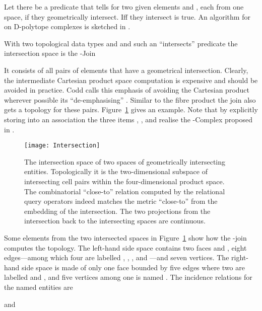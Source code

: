\documentclass[5p]{elsarticle}
\newcommand{\qq}[1]{``#1''}
\begin{document}
Let there be a predicate  that tells for two given elements  and , each from 
one space, if they geometrically intersect. 
Iff they intersect  is true. An algorithm for  on D-polytope complexes 
is sketched in \cite{SimplicialDecomposition}. 

With two topological data types  and  and such an \qq{intersects} predicate 
 the intersection space is the -Join 

It consists of all pairs of elements that have a geometrical intersection. 
Clearly, the intermediate Cartesian product space computation is expensive and should be 
avoided in practice. Codd calls this emphasis of avoiding the 
Cartesian product wherever possible its \qq{de-emphasising} \cite{Codd:RMV2}. 
Similar to the fibre product the join also gets a topology for these pairs. 
Figure~\ref{fig:Intersection} gives an example. 
Note that by explicitly storing  into an association  the three 
items , , and  realise the -Complex proposed in \cite{Qomplex}. 

\begin{figure}
\begin{center}
\texttt{[image: Intersection]}
\end{center}
\caption{The intersection space of two spaces of geometrically intersecting entities. 
Topologically it is the two-dimensional subspace of intersecting cell pairs within the 
four-dimensional product space. 
The combinatorial \qq{close-to} relation computed by the relational query 
operators indeed matches the metric \qq{close-to} from the embedding of the intersection. 
The two projections from the intersection back to the intersecting spaces are continuous.}
\label{fig:Intersection}
\end{figure}

Some elements from the two intersected spaces in Figure~\ref{fig:Intersection} 
show how the -join computes the topology. 
The left-hand side space contains two faces  and , eight edges---among which four are 
labelled , , , and ---and seven vertices.  
The right-hand side space is made of only one face  bounded by five edges where two are 
labelled  and , and five vertices among one is named . 
The incidence relations for the named entities are 

and 
\end{document}
